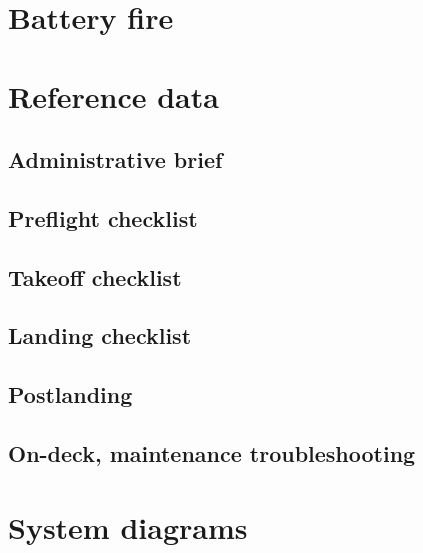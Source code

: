 \documentclass{book}
\begin{document}
\chapter{Battery fire}
\minitoc

\chapter{Reference data}
\minitoc %
\section{Administrative brief}
\section{Preflight checklist}
\section{Takeoff checklist}
\section{Landing checklist}
\section{Postlanding}
\section{On-deck, maintenance troubleshooting}

\chapter{System diagrams}

\end{document}
